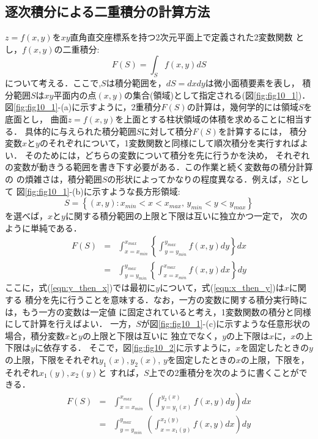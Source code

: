 \documentclass[10pt,a4j]{jarticle}
\begin{document}
\subsection{逐次積分による二重積分の計算方法}
$z=f(x,y)$を$xy$直角直交座標系を持つ2次元平面上で定義された2変数関数
とし，$f(x,y)$の二重積分:
\begin{equation}
	F(S)=\int_S f(x,y) dS
	\label{eqn:Int2D}
\end{equation}
について考える．ここで,$S$は積分範囲を，$dS=dxdy$は微小面積要素を表し，
積分範囲$S$は$xy$平面内の点$(x,y)$の集合(領域)として指定される(図\ref{fig:fig10_1})．
図\ref{fig:fig10_1}-(a)に示すように，2重積分$F(S)$の計算は，幾何学的には領域$S$を底面とし，
曲面$z=f(x,y)$を上面とする柱状領域の体積を求めることに相当する．
具体的に与えられた積分範囲$S$に対して積分$F(S)$を計算するには，
積分変数$x$と$y$のそれぞれについて，1変数関数と同様にして順次積分を実行すればよい．
そのためには，どちらの変数について積分を先に行うかを決め，
それぞれの変数が動きうる範囲を書き下す必要がある．この作業と続く変数毎の積分計算の
の煩雑さは，積分範囲$S$の形状によってかなりの程度異なる．例えば，$S$として
図\ref{fig:fig10_1}-(b)に示すような長方形領域:
\begin{equation}
	S=\left\{(x,y):x_{min}<x<x_{max}, \, y_{min}<y<y_{max} \right\}
	\label{eqn:Sa}
\end{equation}
を選べば，$x$と$y$に関する積分範囲の上限と下限は互いに独立かつ一定で，
次のように単純である．
\begin{eqnarray}
	F(S)
	&=&
	\int_{x=x_{min}}^{x_{max}}\left\{\int_{y=y_{min}}^{y_{max}} f(x,y)dy\right\} dx
	\label{eqn:y_then_x}
	\\
	&=&
	\int_{y=y_{min}}^{y_{max}}\left\{\int_{x=x_{min}}^{x_{max}} f(x,y)dx\right\} dy
	\label{eqn:x_then_y}
\end{eqnarray}
ここに，式(\ref{eqn:y_then_x})では最初に$y$について，式(\ref{eqn:x_then_y})は$x$に関する
積分を先に行うことを意味する．なお，一方の変数に関する積分実行時には，もう一方の変数は一定値
に固定されていると考え，1変数関数の積分と同様にして計算を行えばよい．
一方，$S$が図\ref{fig:fig10_1}-(c)に示すような任意形状の場合，積分変数$x$と$y$の上限と下限は互いに
独立でなく，$y$の上下限は$x$に，$x$の上下限は$y$に依存する．
そこで，図\ref{fig:fig10_2}に示すように，$x$を固定したときの$y$の上限，下限をそれぞれ$y_1(x),y_2(x)$,
$y$を固定したときの$x$の上限，下限を，それぞれ$x_1(y),x_2(y)$と
すれば，$S$上での2重積分を次のように書くことができる．
\begin{eqnarray}
	F(S) &=& 
	\int_{x=x_{min}}^{x_{max}}\ \left( \int_{y=y_1(x)}^{y_2(x)}f(x,y)dy\right) dx
	\label{eqn:iint_xy}
	\\
	&=& 
	\int_{y=y_{min}}^{y_{max}}\ \left( \int_{x=x_1(y)}^{x_2(y)}f(x,y)dx\right) dy
	\label{eqn:iint_yx}
\end{eqnarray}
\end{document}
